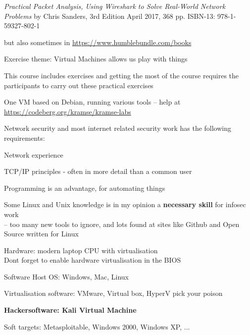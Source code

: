 \documentclass[Screen16to9,17pt]{foils}
\begin{document}

\emph{Practical Packet Analysis,
Using Wireshark to Solve Real-World Network Problems}
by Chris Sanders, 3rd Edition
April 2017, 368 pp.
ISBN-13:
978-1-59327-802-1

 but also sometimes in \url{https://www.humblebundle.com/books}



Exercise theme: Virtual Machines allows us play with things

\begin{list1}
\item This course includes exercises and getting the most of the course requires the participants to carry out these practical exercises
\item One VM based on Debian, running various tools -- help at \url{https://codeberg.org/kramse/kramse-labs}
\item Network security and most internet related security work has the following requirements:
\begin{list2}
\item Network experience
\item TCP/IP principles - often in more detail than a common user
\item Programming is an advantage, for automating things
\item Some Linux and Unix knowledge is in my opinion a {\bf necessary skill} for infosec work\\
-- too many new tools to ignore, and lots found at sites like Github and Open Source written for Linux
\end{list2}
\end{list1}



\begin{list2}
\item Hardware: modern laptop CPU with virtualisation\\
Dont forget to enable hardware virtualisation in the BIOS
\item Software Host OS: Windows, Mac, Linux
\item Virtualisation software: VMware, Virtual box, HyperV pick your poison
\item {\bf Hackersoftware: Kali Virtual Machine }
\item Soft targets: Metasploitable, Windows 2000, Windows XP, ...
\end{list2}
\end{document}
